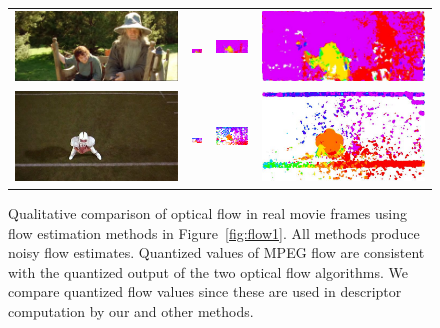 \documentclass[10pt,twocolumn,letterpaper]{article}
\begin{document}
\begin{figure}[t!]
\begin{center}
\begin{tabular}{cccc}
\includegraphics[width=.23\textwidth]{figures/flow/flow_actioncliptest00538_frame014.jpeg} & 
\includegraphics[width=.23\textwidth]{figures/flow/flow_actioncliptest00538_frame014_mv_quant.png} & 
\includegraphics[width=.23\textwidth]{figures/flow/flow_actioncliptest00538_frame014_stip_quant.png} & 
\includegraphics[width=.23\textwidth]{figures/flow/flow_actioncliptest00538_frame014_traj_quant.jpeg} \\
\includegraphics[width=.23\textwidth]{figures/flow/flow_actioncliptest00870_frame013.jpeg} & 
\includegraphics[width=.23\textwidth]{figures/flow/flow_actioncliptest00870_frame014_mv_quant.png} & 
\includegraphics[width=.23\textwidth]{figures/flow/flow_actioncliptest00870_frame013_stip_quant.png} & 
\includegraphics[width=.23\textwidth]{figures/flow/flow_actioncliptest00870_frame013_traj_quant.jpeg} \vspace{.2cm}\\
\end{tabular}
\caption{Qualitative comparison of optical flow in real movie frames using flow estimation methods in Figure~\ref{fig:flow1}. All methods produce noisy flow estimates. Quantized values of MPEG flow are consistent with the quantized output of the two optical flow algorithms. We compare quantized flow values since these are used in descriptor computation by our and other methods.\vspace{-.6cm}}
\label{fig:flow2}
\end{center}
\end{figure}
\end{document}
